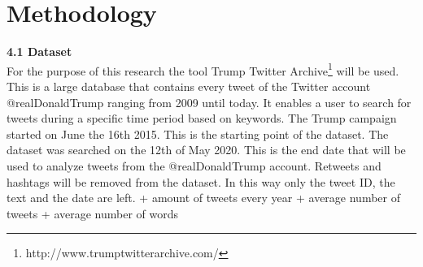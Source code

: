 \documentclass[a4paper,pdf]{article}
\begin{document}




\section{Methodology}

\textbf{4.1 Dataset}\\
\break
For the purpose of this research the tool Trump Twitter Archive\footnote{http://www.trumptwitterarchive.com/} will be used. This is a large database that contains every tweet of the Twitter account @realDonaldTrump ranging from 2009 until today. It enables a user to search for tweets during a specific time period based on keywords. The Trump campaign started on June the 16th 2015. This is the starting point of the dataset. The dataset was searched on the 12th of May 2020. This is the end date that will be used to analyze tweets from the @realDonaldTrump account. Retweets and hashtags will be removed from the dataset. In this way only the tweet ID, the text and the date are left. + amount of tweets every year + average number of tweets + average number of words\\
\break{}
\end{document}
